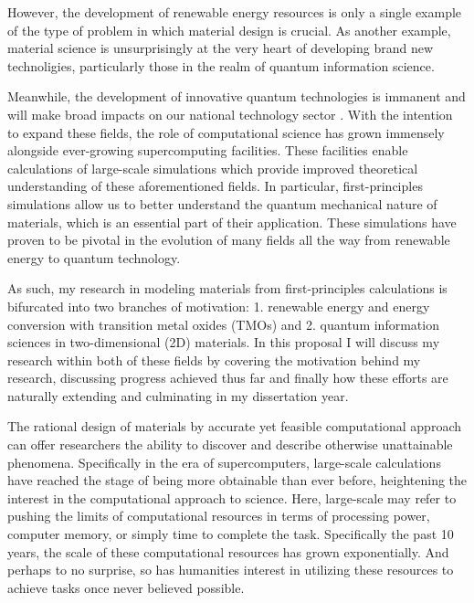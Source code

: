 However, the development of renewable energy resources is only a single example of the type of problem in which material design is crucial. As another example, material science is unsurprisingly at the very heart of developing brand new technoligies, particularly those in the realm of quantum information science.


Meanwhile, the development of innovative quantum technologies is immanent and will make broad impacts on our national technology sector \cite{quantum}. With the intention to expand these fields, the role of computational science has grown immensely alongside ever-growing supercomputing facilities. These facilities enable calculations of large-scale simulations which provide improved theoretical understanding of these aforementioned fields. In particular, first-principles simulations allow us to better understand the quantum mechanical nature of materials, which is an essential part of their application. These simulations have proven to be pivotal in the evolution of many fields all the way from renewable energy to quantum technology.

As such, my research in modeling materials from first-principles calculations is bifurcated into two branches of motivation: 1. renewable energy and energy conversion with transition metal oxides (TMOs) and 2. quantum information sciences in two-dimensional (2D) materials. In this proposal I will discuss my research within both of these fields by covering the motivation behind my research, discussing progress achieved thus far and finally how these efforts are naturally extending and culminating in my dissertation year.


%
The rational design of materials by accurate yet feasible computational approach can offer researchers the ability to discover and describe otherwise unattainable phenomena. Specifically in the era of supercomputers, large-scale calculations have reached the stage of being more obtainable than ever before, heightening the interest in the computational approach to science. Here, large-scale may refer to pushing the limits of computational resources in terms of processing power, computer memory, or simply time to complete the task. Specifically the past 10 years, the scale of these computational resources has grown exponentially. And perhaps to no surprise, so has humanities interest in utilizing these resources to achieve tasks once never believed possible.


